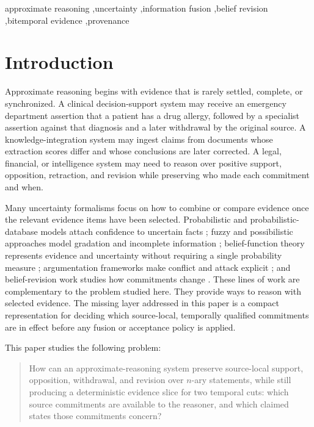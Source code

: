\documentclass[a4paper,fleqn]{cas-sc}
\theoremstyle{plain}
\theoremstyle{remark}
\begin{document}
\begin{keywords}
approximate reasoning \sep uncertainty \sep information fusion \sep belief revision \sep bitemporal evidence \sep provenance
\end{keywords}

\maketitle

\section{Introduction}
Approximate reasoning begins with evidence that is rarely settled, complete, or synchronized. A clinical decision-support system may receive an emergency department assertion that a patient has a drug allergy, followed by a specialist assertion against that diagnosis and a later withdrawal by the original source. A knowledge-integration system may ingest claims from documents whose extraction scores differ and whose conclusions are later corrected. A legal, financial, or intelligence system may need to reason over positive support, opposition, retraction, and revision while preserving who made each commitment and when.

Many uncertainty formalisms focus on how to combine or compare evidence once the relevant evidence items have been selected. Probabilistic and probabilistic-database models attach confidence to uncertain facts \cite{BenjellounEtAl,DyllaEtAl}; fuzzy and possibilistic approaches model gradation and incomplete information \cite{Zadeh1965,DuboisPrade1988}; belief-function theory represents evidence and uncertainty without requiring a single probability measure \cite{Dempster1967,Shafer1976}; argumentation frameworks make conflict and attack explicit \cite{Dung1995}; and belief-revision work studies how commitments change \cite{AGM1985}. These lines of work are complementary to the problem studied here. They provide ways to reason with selected evidence. The missing layer addressed in this paper is a compact representation for deciding which source-local, temporally qualified commitments are in effect before any fusion or acceptance policy is applied.

This paper studies the following problem:

\begin{quote}
\small
How can an approximate-reasoning system preserve source-local support, opposition, withdrawal, and revision over \(n\)-ary statements, while still producing a deterministic evidence slice for two temporal cuts: which source commitments are available to the reasoner, and which claimed states those commitments concern?
\end{quote}
\end{document}
